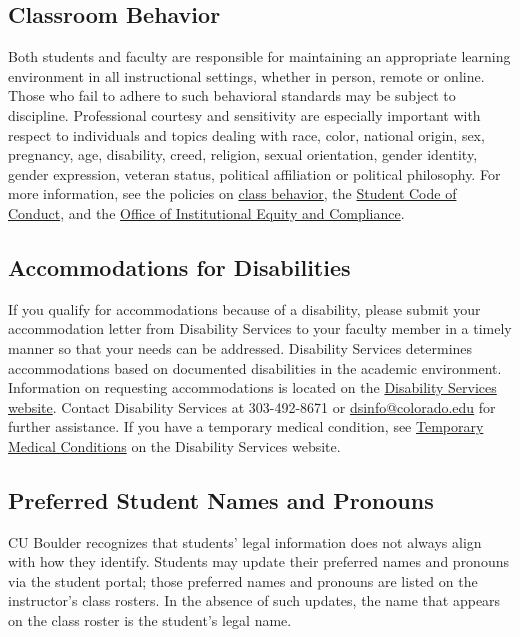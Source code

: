 \documentclass[11pt]{memoir}
\begin{document}
\subsection{Classroom Behavior}
Both students and faculty are responsible for maintaining an appropriate learning environment in all instructional settings, whether in person, remote or online. Those who fail to adhere to such behavioral standards may be subject to discipline. Professional courtesy and sensitivity are especially important with respect to individuals and topics dealing with race, color, national origin, sex, pregnancy, age, disability, creed, religion, sexual orientation, gender identity, gender expression, veteran status, political affiliation or political philosophy. For more information, see the policies on \href{http://www.colorado.edu/policies/student-classroom-and-course-related-behavior}{class behavior}, the \href{http://www.colorado.edu/osc/#student_code}{Student Code of Conduct}, and the \href{https://www.colorado.edu/oiec/}{Office of Institutional Equity and Compliance}.

\subsection{Accommodations for Disabilities}
If you qualify for accommodations because of a disability, please submit your accommodation letter from Disability Services to your faculty member in a timely manner so that your needs can be addressed.  Disability Services determines accommodations based on documented disabilities in the academic environment.  Information on requesting accommodations is located on the \href{www.colorado.edu/disabilityservices/students}{Disability Services website}. Contact Disability Services at 303-492-8671 or \href{mailto:dsinfo@colorado.edu}{dsinfo@colorado.edu} for further assistance. If you have a temporary medical condition, see \href{http://www.colorado.edu/disabilityservices/students/temporary-medical-conditions}{Temporary Medical Conditions} on the Disability Services website.

\subsection{Preferred Student Names and Pronouns}
CU Boulder recognizes that students' legal information does not always align with how they identify. Students may update their preferred names and pronouns via the student portal; those preferred names and pronouns are listed on the instructor's class rosters. In the absence of such updates, the name that appears on the class roster is the student's legal name.
\end{document}
